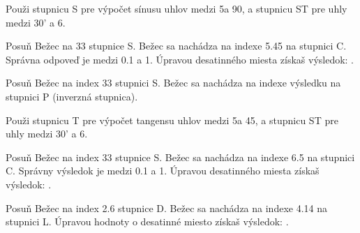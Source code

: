 \begin{multicols*}{3}
{  

\footnotesize Použi stupnicu S pre výpočet sínusu uhlov medzi 5\textdegree a 90\textdegree, a stupnicu ST pre uhly medzi 30' a 6\textdegree. \normalsize

Posuň Bežec na 33 stupnice S.
Bežec sa nachádza na indexe 5.45 na stupnici C.
Správna odpoveď je medzi 0.1 a 1. Úpravou desatinného miesta získaš výsledok: .


Posuň Bežec na index 33 stupnici S.
Bežec sa nachádza na indexe výsledku  na stupnici P (inverzná stupnica).


\footnotesize Použi stupnicu T pre výpočet tangensu uhlov medzi 5\textdegree a 45\textdegree, a stupnicu ST pre uhly medzi 30' a 6\textdegree. \normalsize

Posuň Bežec na index 33 stupnice S.
Bežec sa nachádza na indexe 6.5 na stupnici C.
Správny výsledok je medzi 0.1 a 1. Úpravou desatinného miesta získaš výsledok: .


Posuň Bežec na index 2.6 stupnice D.
Bežec sa nachádza na indexe 4.14 na stupnici L.
Úpravou hodnoty o desatinné miesto získaš výsledok: .
  }
  \end{multicols*}
  

